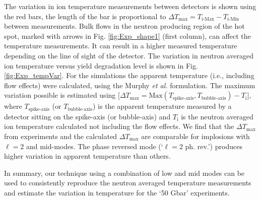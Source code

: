 \documentclass[aip,reprint]{revtex4-1}
\begin{document}
The variation in ion temperature measurements between detectors is shown using the red bars, the length of the bar is proportional to $\Delta T_\text{max}=T_\text{i-Max} -T_\text{i-Min}$ between measurements. Bulk flows in the neutron producing region of the hot spot, marked with arrows in Fig. \ref{fig:Exp_shape1} (first column), can affect the temperature measurements. It can result in a higher measured temperature depending on the line of sight of the detector. The variation in neutron averaged ion temperature versus yield degradation level is shown in Fig. \ref{fig:Exp_tempVar}. For the simulations the apparent temperature (i.e., including flow effects) were calculated, using the Murphy \textit{et al.}\cite{murphy_the_2014} formulation. The maximum variation possible is estimated using [$\Delta T_\text{max} = \text{Max}(T_\text{spike-axis}, T_\text{bubble-axis})- T_\text{i}$], where $T_\text{spike-axis}$ (or $T_\text{bubble-axis}$) is the apparent temperature measured by a detector sitting on the spike-axis (or bubble-axis) and $T_\text{i}$ is the neutron averaged ion temperature calculated not including the flow effects. We find that the $\Delta T_\text{max}$ from experiments and the calculated $\Delta T_\text{max}$ are comparable for implosions with $\ell=2$ and mid-modes. The phase reversed mode (`$\ell=2$ ph. rev.') produces higher variation in apparent temperature than others. 

In summary, our technique using a combination of low and mid modes can be used to consistently reproduce the neutron averaged temperature measurements and estimate the variation in temperature for the `50 Gbar' experiments. 
%
%
%
%
%
\end{document}
